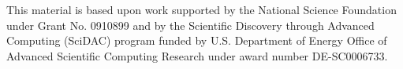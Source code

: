This material is based upon work supported by the National Science 
Foundation under Grant No. 0910899 and 
by the Scientific Discovery
through Advanced Computing (SciDAC) program funded by U.S. Department of
Energy Office of Advanced Scientific Computing Research under award number
DE-SC0006733.


